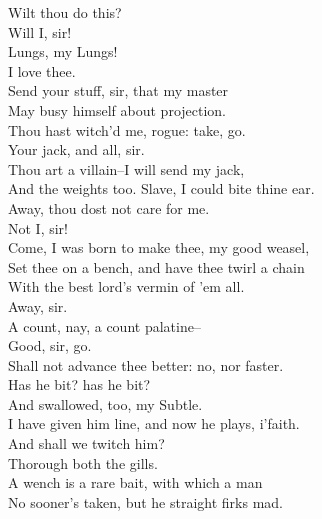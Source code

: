 \documentclass{memoir}
\begin{document}
\begin{drama*}
\mammonspeaks  Wilt thou do this?\\
\facespeaks {} Will I, sir!\\
\mammonspeaks {} Lungs, my Lungs!\\
 I love thee.\\
\facespeaks {} Send your stuff, sir, that my master\\
 May busy himself about projection.\\
\mammonspeaks  Thou hast witch'd me, rogue: take, go.\\
\facespeaks {} Your jack, and all, sir.\\
\mammonspeaks  Thou art a villain--I will send my jack,\\
 And the weights too. Slave, I could bite thine ear.\\
 Away, thou dost not care for me.\\
\facespeaks {} Not I, sir!\\
\mammonspeaks  Come, I was born to make thee, my good weasel,\\
 Set thee on a bench, and have thee twirl a chain\\
 With the best lord's vermin of 'em all.\\
\facespeaks {} Away, sir.\\
\mammonspeaks  A count, nay, a count palatine--\\
\facespeaks {} Good, sir, go.\\
\mammonspeaks  Shall not advance thee better: no, nor faster.\\
\subtlespeaks  Has he bit? has he bit?\\
\facespeaks {} And swallowed, too, my Subtle.\\
 I have given him line, and now he plays, i'faith.\\
\subtlespeaks  And shall we twitch him?\\
\facespeaks {} Thorough both the gills.\\
 A wench is a rare bait, with which a man\\
 No sooner's taken, but he straight firks mad.\\

\end{drama*}
\end{document}
